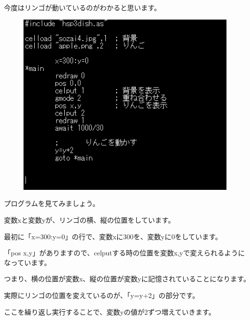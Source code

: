 今度はリンゴが動いているのがわかると思います。


\begin{figure}[H]
    \begin{center}
      \includegraphics[keepaspectratio,width=10.954cm,height=9.213cm]{text04-img/s_fallsrc.png}
    \end{center}
    \label{fig:prog_menu}
\end{figure}


プログラムを見てみましょう。

変数xと変数yが、リンゴの横、縦の位置をしています。

最初に「x=300:y=0」の行で、変数xに300を、変数yに0をしています。



\begin{description}
    \item {}
    \item {}
    \item {}
\end{description}

「pos x,y」がありますので、celputする時の位置を変数x,yで変えられるようになっています。

つまり、横の位置が変数x、縦の位置が変数yに記憶されていることになります。

実際にリンゴの位置を変えているのが、「y=y+2」の部分です。

ここを繰り返し実行することで、変数yの値が2ずつ増えていきます。


